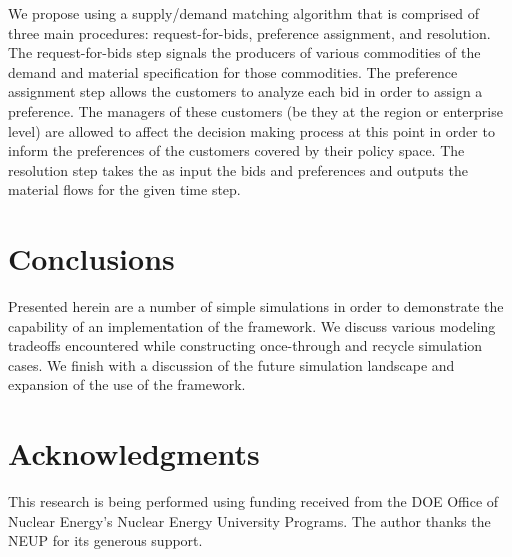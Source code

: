 \documentclass{anstrans}
\begin{document}
We propose using a supply/demand matching algorithm that is comprised 
of three main procedures: request-for-bids, preference assignment, 
and resolution. The request-for-bids step signals the producers of 
various commodities of the demand and material specification for 
those commodities. The preference assignment step allows the customers
to analyze each bid in order to assign a preference. The managers of 
these customers (be they at the region or enterprise level) are 
allowed to affect the decision making process at this point in order 
to inform the preferences of the customers covered by their policy 
space. The resolution step takes the as input the bids and 
preferences and outputs the material flows for the given time step.\cite{cyclus2012}

\section{Conclusions}
Presented herein are a number of simple simulations in order to 
demonstrate the capability of an implementation of the framework. We 
discuss various modeling tradeoffs encountered while constructing 
once-through and recycle simulation cases. We finish with a 
discussion of the future simulation landscape and expansion of the 
use of the framework.

\section{Acknowledgments}
This research is being performed using funding received from the DOE
Office of Nuclear Energy's Nuclear Energy University Programs.  The
author thanks the NEUP for its generous support.


\end{document}
